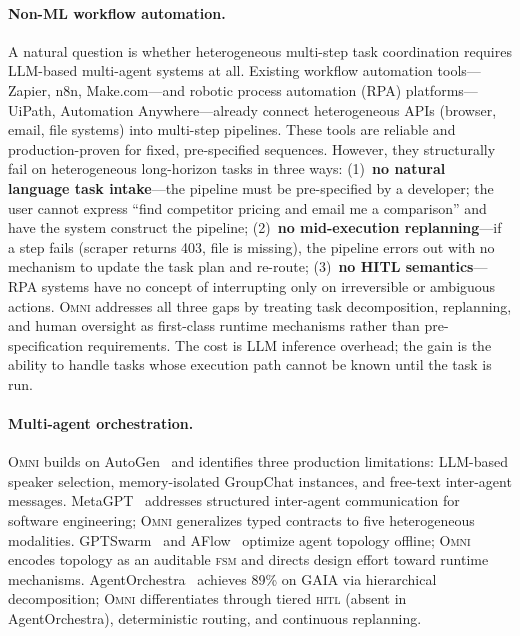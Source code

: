 \documentclass[11pt,a4paper]{article}
\newcommand{\omni}{\textsc{Omni}}
\newcommand{\hitl}{\textsc{hitl}}
\newcommand{\fsm}{\textsc{fsm}}
\begin{document}
\paragraph{Non-ML workflow automation.}
A natural question is whether heterogeneous multi-step task coordination requires LLM-based multi-agent systems at all. Existing workflow automation tools---Zapier, n8n, Make.com---and robotic process automation (RPA) platforms---UiPath, Automation Anywhere---already connect heterogeneous APIs (browser, email, file systems) into multi-step pipelines. These tools are reliable and production-proven for fixed, pre-specified sequences. However, they structurally fail on heterogeneous long-horizon tasks in three ways: (1)~\textbf{no natural language task intake}---the pipeline must be pre-specified by a developer; the user cannot express ``find competitor pricing and email me a comparison'' and have the system construct the pipeline; (2)~\textbf{no mid-execution replanning}---if a step fails (scraper returns 403, file is missing), the pipeline errors out with no mechanism to update the task plan and re-route; (3)~\textbf{no HITL semantics}---RPA systems have no concept of interrupting only on irreversible or ambiguous actions. \omni{} addresses all three gaps by treating task decomposition, replanning, and human oversight as first-class runtime mechanisms rather than pre-specification requirements. The cost is LLM inference overhead; the gain is the ability to handle tasks whose execution path cannot be known until the task is run.

\paragraph{Multi-agent orchestration.} \omni{} builds on AutoGen~\cite{wu2024autogen} and identifies three production limitations: LLM-based speaker selection, memory-isolated GroupChat instances, and free-text inter-agent messages. MetaGPT~\cite{hong2024metagpt} addresses structured inter-agent communication for software engineering; \omni{} generalizes typed contracts to five heterogeneous modalities. GPTSwarm~\cite{besta2024gptswarm} and AFlow~\cite{zhao2025aflow} optimize agent topology offline; \omni{} encodes topology as an auditable \fsm{} and directs design effort toward runtime mechanisms. AgentOrchestra~\cite{agentorchestra2025} achieves 89\% on GAIA via hierarchical decomposition; \omni{} differentiates through tiered \hitl{} (absent in AgentOrchestra), deterministic routing, and continuous replanning.
\end{document}
